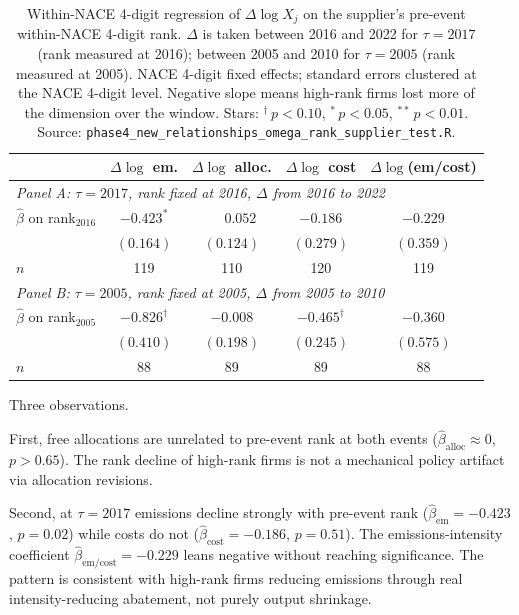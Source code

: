 \begin{table}[H]
    \centering
    \caption{Within-NACE 4-digit regression of $\Delta \log X_j$ on the supplier's pre-event within-NACE 4-digit rank. $\Delta$ is taken between 2016 and 2022 for $\tau = 2017$ (rank measured at 2016); between 2005 and 2010 for $\tau = 2005$ (rank measured at 2005). NACE 4-digit fixed effects; standard errors clustered at the NACE 4-digit level. Negative slope means high-rank firms lost more of the dimension over the window. Stars: $^{\dagger}\,p < 0.10$, $^{*}\,p < 0.05$, $^{**}\,p < 0.01$. Source: \texttt{phase4\_new\_relationships\_omega\_rank\_supplier\_test.R}.}
    \label{tab:app_omega_rank_decomp}
    \begin{tabular}{lcccc}
        \toprule
                            & $\Delta \log$ em.  & $\Delta \log$ alloc.  & $\Delta \log$ cost & $\Delta \log$(em/cost) \\
        \midrule
        \multicolumn{5}{l}{\textit{Panel A: $\tau = 2017$, rank fixed at 2016, $\Delta$ from 2016 to 2022}} \\
        $\hat\beta$ on rank$_{2016}$ & $-0.423^{*}$ & $\phantom{-}0.052$ & $-0.186$ & $-0.229$ \\
                                    & $(0.164)$    & $(0.124)$           & $(0.279)$ & $(0.359)$ \\
        $n$                         & 119          & 110                 & 120       & 119 \\[0.5ex]
        \multicolumn{5}{l}{\textit{Panel B: $\tau = 2005$, rank fixed at 2005, $\Delta$ from 2005 to 2010}} \\
        $\hat\beta$ on rank$_{2005}$ & $-0.826^{\dagger}$ & $-0.008$  & $-0.465^{\dagger}$ & $-0.360$ \\
                                    & $(0.410)$          & $(0.198)$ & $(0.245)$          & $(0.575)$ \\
        $n$                         & 88                 & 89        & 89                 & 88 \\
        \bottomrule
    \end{tabular}
\end{table}

Three observations.

First, free allocations are unrelated to pre-event rank at both events ($\hat\beta_{\text{alloc}} \approx 0$, $p > 0.65$). The rank decline of high-rank firms is not a mechanical policy artifact via allocation revisions.

Second, at $\tau = 2017$ emissions decline strongly with pre-event rank ($\hat\beta_{\text{em}} = -0.423$, $p = 0.02$) while costs do not ($\hat\beta_{\text{cost}} = -0.186$, $p = 0.51$). The emissions-intensity coefficient $\hat\beta_{\text{em/cost}} = -0.229$ leans negative without reaching significance. The pattern is consistent with high-rank firms reducing emissions through real intensity-reducing abatement, not purely output shrinkage.

